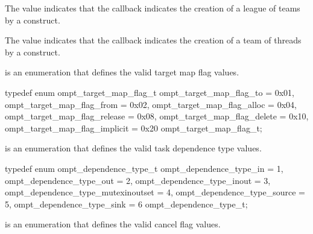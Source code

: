 The value  indicates that the callback indicates
the creation of a league of teams by a  construct.

The value  indicates that the callback indicates
the creation of a team of threads by a  construct.






\label{sec:ompt_target_map_flag_t}
 is an enumeration that defines the valid target map flag values.


\begin{ccppspecific}
\begin{omptEnum}
typedef enum ompt_target_map_flag_t {
  ompt_target_map_flag_to             = 0x01,
  ompt_target_map_flag_from           = 0x02,
  ompt_target_map_flag_alloc          = 0x04,
  ompt_target_map_flag_release        = 0x08,
  ompt_target_map_flag_delete         = 0x10,
  ompt_target_map_flag_implicit       = 0x20
} ompt_target_map_flag_t;
\end{omptEnum}
\end{ccppspecific}





\label{sec:ompt_dependence_type_t}
 is an enumeration that defines the valid task dependence 
type values.


\begin{ccppspecific}
\begin{omptEnum}
typedef enum ompt_dependence_type_t {
  ompt_dependence_type_in              = 1,
  ompt_dependence_type_out             = 2,
  ompt_dependence_type_inout           = 3,
  ompt_dependence_type_mutexinoutset   = 4,
  ompt_dependence_type_source          = 5,
  ompt_dependence_type_sink            = 6
} ompt_dependence_type_t;
\end{omptEnum}
\end{ccppspecific}






\label{sec:ompt_cancel_flag_t}
 is an enumeration that defines the valid cancel flag values.


